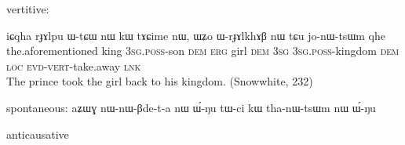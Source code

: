 \documentclass[oldfontcommands,oneside,a4paper,11pt]{article}
\newcommand{\ipa}[1]{{\phon \mbox{#1}}} %
\begin{document}
vertitive:

\begin{exe}
\ex
\gll
\ipa{iɕqha} 	\ipa{rɟɤlpu} 	\ipa{ɯ-tɕɯ} 	\ipa{nɯ} 	\ipa{kɯ} 	\ipa{tɤɕime} 	\ipa{nɯ,} 	\ipa{ɯʑo} 	\ipa{ɯ-rɟɤlkhɤβ} 	\ipa{nɯ} 	\ipa{tɕu} 	\ipa{jo-nɯ-tsɯm} 	\ipa{qhe} \\
the.aforementioned king \textsc{3sg.poss}-son \textsc{dem} \textsc{erg} girl \textsc{dem} \textsc{3sg} \textsc{3sg.poss}-kingdom \textsc{dem} \textsc{loc} \textsc{evd-vert}-take.away \textsc{lnk} \\
\glt The prince took the girl back to his kingdom. (Snowwhite, 232)
\end{exe}

spontaneous:
\ipa{aʑɯɣ} 	\ipa{nɯ-nɯ-βde-t-a} 	\ipa{nɯ} 	\ipa{ɯ́-ŋu} 	\ipa{tɯ-ci} 	\ipa{kɯ} 	\ipa{tha-nɯ-tsɯm} 	\ipa{nɯ} 	\ipa{ɯ́-ŋu} 


 anticausative
 
\end{document}
